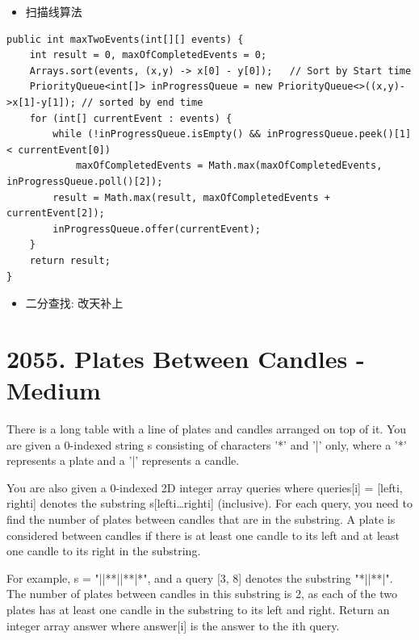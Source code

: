 \documentclass[9pt, b5paaper]{book}
\begin{document}
\begin{itemize}
\item 扫描线算法
\end{itemize}
\begin{verbatim}
public int maxTwoEvents(int[][] events) {
    int result = 0, maxOfCompletedEvents = 0;
    Arrays.sort(events, (x,y) -> x[0] - y[0]);   // Sort by Start time
    PriorityQueue<int[]> inProgressQueue = new PriorityQueue<>((x,y)->x[1]-y[1]); // sorted by end time
    for (int[] currentEvent : events) {
        while (!inProgressQueue.isEmpty() && inProgressQueue.peek()[1] < currentEvent[0])
            maxOfCompletedEvents = Math.max(maxOfCompletedEvents, inProgressQueue.poll()[2]);
        result = Math.max(result, maxOfCompletedEvents + currentEvent[2]);
        inProgressQueue.offer(currentEvent);
    }
    return result;
}
\end{verbatim}
\begin{itemize}
\item 二分查找: 改天补上
\end{itemize}

\section{2055. Plates Between Candles - Medium}
\label{sec-19-2}
There is a long table with a line of plates and candles arranged on top of it. You are given a 0-indexed string s consisting of characters '*' and '|' only, where a '*' represents a plate and a '|' represents a candle.

You are also given a 0-indexed 2D integer array queries where queries[i] = [lefti, righti] denotes the substring s[lefti\ldots{}righti] (inclusive). For each query, you need to find the number of plates between candles that are in the substring. A plate is considered between candles if there is at least one candle to its left and at least one candle to its right in the substring.

For example, s = "||**||**|*", and a query [3, 8] denotes the substring "*||**|". The number of plates between candles in this substring is 2, as each of the two plates has at least one candle in the substring to its left and right.
Return an integer array answer where answer[i] is the answer to the ith query.
\end{document}
